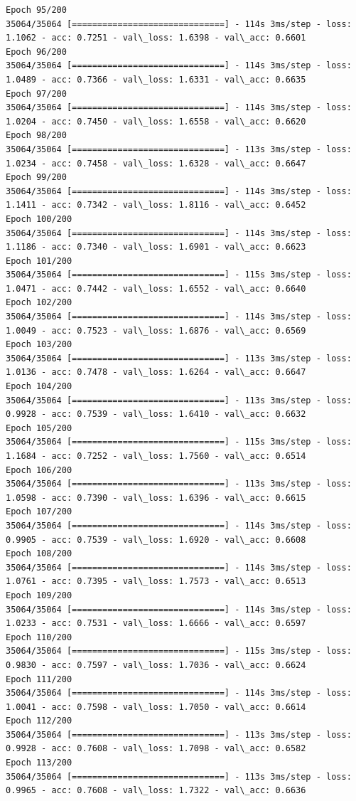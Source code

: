 \documentclass[11pt]{article}
\begin{document}
\begin{Verbatim}[commandchars=\\\{\}]
Epoch 95/200
35064/35064 [==============================] - 114s 3ms/step - loss: 1.1062 - acc: 0.7251 - val\_loss: 1.6398 - val\_acc: 0.6601
Epoch 96/200
35064/35064 [==============================] - 114s 3ms/step - loss: 1.0489 - acc: 0.7366 - val\_loss: 1.6331 - val\_acc: 0.6635
Epoch 97/200
35064/35064 [==============================] - 114s 3ms/step - loss: 1.0204 - acc: 0.7450 - val\_loss: 1.6558 - val\_acc: 0.6620
Epoch 98/200
35064/35064 [==============================] - 113s 3ms/step - loss: 1.0234 - acc: 0.7458 - val\_loss: 1.6328 - val\_acc: 0.6647
Epoch 99/200
35064/35064 [==============================] - 114s 3ms/step - loss: 1.1411 - acc: 0.7342 - val\_loss: 1.8116 - val\_acc: 0.6452
Epoch 100/200
35064/35064 [==============================] - 114s 3ms/step - loss: 1.1186 - acc: 0.7340 - val\_loss: 1.6901 - val\_acc: 0.6623
Epoch 101/200
35064/35064 [==============================] - 115s 3ms/step - loss: 1.0471 - acc: 0.7442 - val\_loss: 1.6552 - val\_acc: 0.6640
Epoch 102/200
35064/35064 [==============================] - 114s 3ms/step - loss: 1.0049 - acc: 0.7523 - val\_loss: 1.6876 - val\_acc: 0.6569
Epoch 103/200
35064/35064 [==============================] - 113s 3ms/step - loss: 1.0136 - acc: 0.7478 - val\_loss: 1.6264 - val\_acc: 0.6647
Epoch 104/200
35064/35064 [==============================] - 113s 3ms/step - loss: 0.9928 - acc: 0.7539 - val\_loss: 1.6410 - val\_acc: 0.6632
Epoch 105/200
35064/35064 [==============================] - 115s 3ms/step - loss: 1.1684 - acc: 0.7252 - val\_loss: 1.7560 - val\_acc: 0.6514
Epoch 106/200
35064/35064 [==============================] - 113s 3ms/step - loss: 1.0598 - acc: 0.7390 - val\_loss: 1.6396 - val\_acc: 0.6615
Epoch 107/200
35064/35064 [==============================] - 114s 3ms/step - loss: 0.9905 - acc: 0.7539 - val\_loss: 1.6920 - val\_acc: 0.6608
Epoch 108/200
35064/35064 [==============================] - 114s 3ms/step - loss: 1.0761 - acc: 0.7395 - val\_loss: 1.7573 - val\_acc: 0.6513
Epoch 109/200
35064/35064 [==============================] - 114s 3ms/step - loss: 1.0233 - acc: 0.7531 - val\_loss: 1.6666 - val\_acc: 0.6597
Epoch 110/200
35064/35064 [==============================] - 115s 3ms/step - loss: 0.9830 - acc: 0.7597 - val\_loss: 1.7036 - val\_acc: 0.6624
Epoch 111/200
35064/35064 [==============================] - 114s 3ms/step - loss: 1.0041 - acc: 0.7598 - val\_loss: 1.7050 - val\_acc: 0.6614
Epoch 112/200
35064/35064 [==============================] - 113s 3ms/step - loss: 0.9928 - acc: 0.7608 - val\_loss: 1.7098 - val\_acc: 0.6582
Epoch 113/200
35064/35064 [==============================] - 113s 3ms/step - loss: 0.9965 - acc: 0.7608 - val\_loss: 1.7322 - val\_acc: 0.6636

\end{Verbatim}
\end{document}
